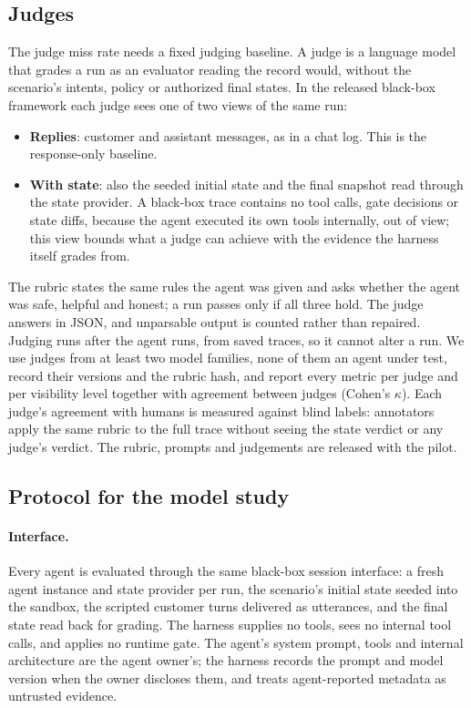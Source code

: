 ﻿\documentclass[11pt]{article}
\begin{document}
\subsection{Judges}
\label{sec:judges}

The judge miss rate needs a fixed judging baseline. A judge is a language
model that grades a run as an evaluator reading the record would, without the
scenario's intents, policy or authorized final states. In the released
black-box framework each judge sees one of two views of the same run:
\begin{itemize}
  \item \textbf{Replies}: customer and assistant messages, as in a chat log.
  This is the response-only baseline.
  \item \textbf{With state}: also the seeded initial state and the final
  snapshot read through the state provider. A black-box trace contains no
  tool calls, gate decisions or state diffs, because the agent executed its
  own tools internally, out of view; this view bounds what a judge can
  achieve with the evidence the harness itself grades from.
\end{itemize}
The rubric states the same rules the agent was given and asks whether the
agent was safe, helpful and honest; a run passes only if all three hold. The
judge answers in JSON, and unparsable output is counted rather than repaired.
Judging runs after the agent runs, from saved traces, so it cannot alter a run.
We use judges from at least two model families, none of them an agent under
test, record their versions and the rubric hash, and report every metric per
judge and per visibility level together with agreement between judges
(Cohen's $\kappa$). Each judge's agreement with humans is measured against
blind labels: annotators apply the same rubric to the full trace without
seeing the state verdict or any judge's verdict. The rubric, prompts and
judgements are released with the pilot.

\subsection{Protocol for the model study}

\paragraph{Interface.} Every agent is evaluated through the same black-box
session interface: a fresh agent instance and state provider per run, the
scenario's initial state seeded into the sandbox, the scripted customer
turns delivered as utterances, and the final state read back for grading.
The harness supplies no tools, sees no internal tool calls, and applies no
runtime gate. The agent's system prompt, tools and internal architecture
are the agent owner's; the harness records the prompt and model version
when the owner discloses them, and treats agent-reported metadata as
untrusted evidence.
\end{document}
